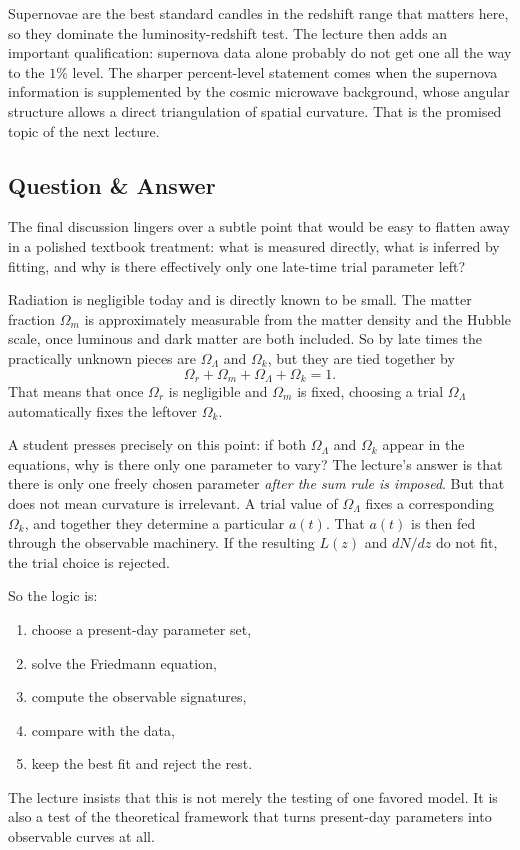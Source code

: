 Supernovae are the best standard candles in the redshift range that matters here, so they dominate the luminosity-redshift test. The lecture then adds an important qualification: supernova data alone probably do not get one all the way to the \(1\%\) level. The sharper percent-level statement comes when the supernova information is supplemented by the cosmic microwave background, whose angular structure allows a direct triangulation of spatial curvature. That is the promised topic of the next lecture.

\subsection{Question \& Answer}

The final discussion lingers over a subtle point that would be easy to flatten away in a polished textbook treatment: what is measured directly, what is inferred by fitting, and why is there effectively only one late-time trial parameter left?

Radiation is negligible today and is directly known to be small. The matter fraction \(\Omega_m\) is approximately measurable from the matter density and the Hubble scale, once luminous and dark matter are both included. So by late times the practically unknown pieces are \(\Omega_\Lambda\) and \(\Omega_k\), but they are tied together by
\begin{equation}
\Omega_r+\Omega_m+\Omega_\Lambda+\Omega_k=1.
\end{equation}
That means that once \(\Omega_r\) is negligible and \(\Omega_m\) is fixed, choosing a trial \(\Omega_\Lambda\) automatically fixes the leftover \(\Omega_k\).

A student presses precisely on this point: if both \(\Omega_\Lambda\) and \(\Omega_k\) appear in the equations, why is there only one parameter to vary? The lecture's answer is that there is only one freely chosen parameter \emph{after the sum rule is imposed}. But that does not mean curvature is irrelevant. A trial value of \(\Omega_\Lambda\) fixes a corresponding \(\Omega_k\), and together they determine a particular \(a(t)\). That \(a(t)\) is then fed through the observable machinery. If the resulting \(L(z)\) and \(dN/dz\) do not fit, the trial choice is rejected.

So the logic is:
\begin{enumerate}
\item choose a present-day parameter set,
\item solve the Friedmann equation,
\item compute the observable signatures,
\item compare with the data,
\item keep the best fit and reject the rest.
\end{enumerate}
The lecture insists that this is not merely the testing of one favored model. It is also a test of the theoretical framework that turns present-day parameters into observable curves at all.

